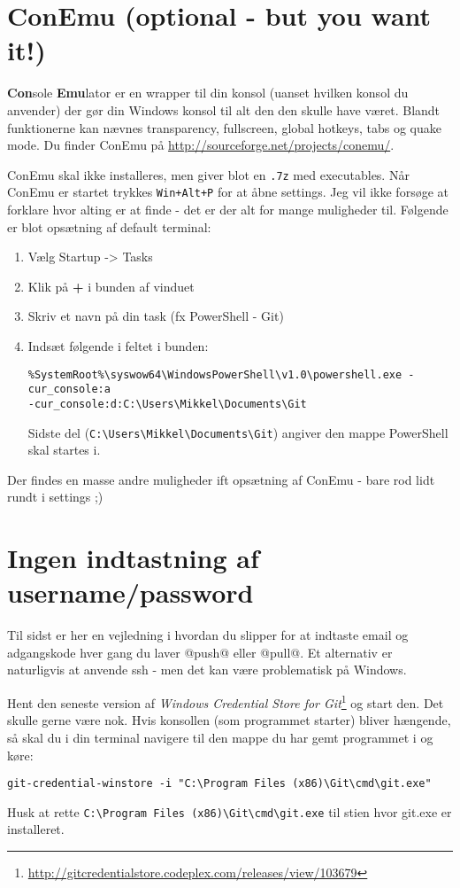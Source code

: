 \section{ConEmu (optional - but you want it!)}

\textbf{Con}sole \textbf{Emu}lator er en wrapper til din konsol (uanset hvilken konsol du anvender) der gør din Windows konsol til alt den den skulle have været.
Blandt funktionerne kan nævnes transparency, fullscreen, global hotkeys, tabs og quake mode.
Du finder ConEmu på \url{http://sourceforge.net/projects/conemu/}.

ConEmu skal ikke installeres, men giver blot en \texttt{.7z} med executables.
Når ConEmu er startet trykkes \texttt{Win+Alt+P} for at åbne settings.
Jeg vil ikke forsøge at forklare hvor alting er at finde - det er der alt for mange muligheder til.
Følgende er blot opsætning af default terminal:
\begin{enumerate}
\item Vælg Startup -> Tasks
\item Klik på \textbf{+} i bunden af vinduet
\item Skriv et navn på din task (fx PowerShell - Git)
\item Indsæt følgende i feltet i bunden:
\begin{lstlisting}
%SystemRoot%\syswow64\WindowsPowerShell\v1.0\powershell.exe -cur_console:a
-cur_console:d:C:\Users\Mikkel\Documents\Git
\end{lstlisting}
Sidste del (\lstinline!C:\Users\Mikkel\Documents\Git!) angiver den mappe PowerShell skal startes i.
\end{enumerate}

Der findes en masse andre muligheder ift opsætning af ConEmu - bare rod lidt rundt i settings ;)

\section{Ingen indtastning af username/password}
Til sidst er her en vejledning i hvordan du slipper for at indtaste email og adgangskode hver gang du laver @push@ eller @pull@.
Et alternativ er naturligvis at anvende ssh - men det kan være problematisk på Windows.

Hent den seneste version af \textit{Windows Credential Store for Git}\footnote{\url{http://gitcredentialstore.codeplex.com/releases/view/103679}} og start den.
Det skulle gerne være nok.
Hvis konsollen (som programmet starter) bliver hængende, så skal du i din terminal navigere til den mappe du har gemt programmet i og køre:
\begin{lstlisting}
git-credential-winstore -i "C:\Program Files (x86)\Git\cmd\git.exe"
\end{lstlisting}
Husk at rette \lstinline!C:\Program Files (x86)\Git\cmd\git.exe! til stien hvor git.exe er installeret.